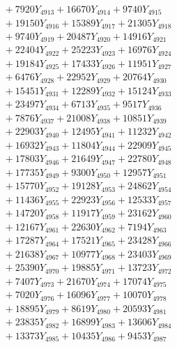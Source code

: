 \documentclass[a4paper,10pt]{article}
\begin{document}
{\begin{align}
&\;  + 7920 Y_{4913} + 16670 Y_{4914} + 9740 Y_{4915} \\[0.3ex]
&\;  + 19150 Y_{4916} + 15389 Y_{4917} + 21305 Y_{4918} \\[0.5ex]\allowbreak
&\;  + 9740 Y_{4919} + 20487 Y_{4920} + 14916 Y_{4921} \\[0.3ex]
&\;  + 22404 Y_{4922} + 25223 Y_{4923} + 16976 Y_{4924} \\[0.3ex]
&\;  + 19184 Y_{4925} + 17433 Y_{4926} + 11951 Y_{4927} \\[0.3ex]
&\;  + 6476 Y_{4928} + 22952 Y_{4929} + 20764 Y_{4930} \\[0.3ex]
&\;  + 15451 Y_{4931} + 12289 Y_{4932} + 15124 Y_{4933} \\[0.3ex]
&\;  + 23497 Y_{4934} + 6713 Y_{4935} + 9517 Y_{4936} \\[0.3ex]
&\;  + 7876 Y_{4937} + 21008 Y_{4938} + 10851 Y_{4939} \\[0.3ex]
&\;  + 22903 Y_{4940} + 12495 Y_{4941} + 11232 Y_{4942} \\[0.3ex]
&\;  + 16932 Y_{4943} + 11804 Y_{4944} + 22909 Y_{4945} \\[0.3ex]
&\;  + 17803 Y_{4946} + 21649 Y_{4947} + 22780 Y_{4948} \\[0.5ex]\allowbreak
&\;  + 17735 Y_{4949} + 9300 Y_{4950} + 12957 Y_{4951} \\[0.3ex]
&\;  + 15770 Y_{4952} + 19128 Y_{4953} + 24862 Y_{4954} \\[0.3ex]
&\;  + 11436 Y_{4955} + 22923 Y_{4956} + 12533 Y_{4957} \\[0.3ex]
&\;  + 14720 Y_{4958} + 11917 Y_{4959} + 23162 Y_{4960} \\[0.3ex]
&\;  + 12167 Y_{4961} + 22630 Y_{4962} + 7194 Y_{4963} \\[0.3ex]
&\;  + 17287 Y_{4964} + 17521 Y_{4965} + 23428 Y_{4966} \\[0.3ex]
&\;  + 21638 Y_{4967} + 10977 Y_{4968} + 23403 Y_{4969} \\[0.3ex]
&\;  + 25390 Y_{4970} + 19885 Y_{4971} + 13723 Y_{4972} \\[0.3ex]
&\;  + 7407 Y_{4973} + 21670 Y_{4974} + 17074 Y_{4975} \\[0.3ex]
&\;  + 7020 Y_{4976} + 16096 Y_{4977} + 10070 Y_{4978} \\[0.5ex]\allowbreak
&\;  + 18895 Y_{4979} + 8619 Y_{4980} + 20593 Y_{4981} \\[0.3ex]
&\;  + 23835 Y_{4982} + 16899 Y_{4983} + 13606 Y_{4984} \\[0.3ex]
&\;  + 13373 Y_{4985} + 10435 Y_{4986} + 9453 Y_{4987} \\[0.3ex]

\end{align}}
\end{document}

